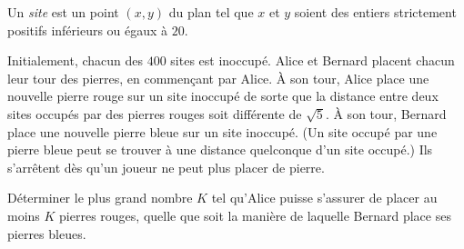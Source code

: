 Un \emph{site} est un point $(x, y)$ du plan tel que $x$ et $y$ soient des entiers strictement positifs
inférieurs ou égaux à $20$.

Initialement, chacun des $400$ sites est inoccupé. Alice et Bernard placent chacun leur tour des pierres, en
commençant par Alice. À son tour, Alice place une nouvelle pierre rouge sur un site inoccupé de sorte que la
distance entre deux sites occupés par des pierres rouges soit différente de $\sqrt{5}$. À son tour, Bernard
place une nouvelle pierre bleue sur un site inoccupé. (Un site occupé par une pierre bleue peut se trouver à
une distance quelconque d'un site occupé.) Ils s'arrêtent dès qu'un joueur ne peut plus placer de pierre.

Déterminer le plus grand nombre $K$ tel qu'Alice puisse s'assurer de placer au moins $K$ pierres rouges,
quelle que soit la manière de laquelle Bernard place ses pierres bleues.

